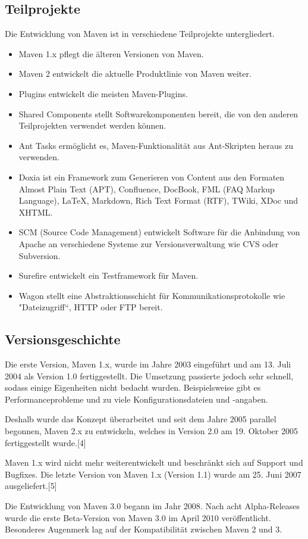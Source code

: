 \documentclass{article}
\begin{document}
\subsection{Teilprojekte}
Die Entwicklung von Maven ist in verschiedene Teilprojekte untergliedert.
\begin{itemize}
\item Maven 1.x pflegt die älteren Versionen von Maven.
\item Maven 2 entwickelt die aktuelle Produktlinie von Maven weiter.
\item Plugins entwickelt die meisten Maven-Plugins.
\item Shared Components stellt Softwarekomponenten bereit, die von den anderen Teilprojekten verwendet werden können.
\item Ant Tasks ermöglicht es, Maven-Funktionalität aus Ant-Skripten heraus zu verwenden.
\item Doxia ist ein Framework zum Generieren von Content aus den Formaten Almost Plain Text (APT), Confluence, DocBook, FML (FAQ Markup Language), LaTeX, Markdown, Rich Text Format (RTF), TWiki, XDoc und XHTML.
\item SCM (Source Code Management) entwickelt Software für die Anbindung von Apache an verschiedene Systeme zur Versionsverwaltung wie CVS oder Subversion.
\item Surefire entwickelt ein Testframework für Maven.
\item Wagon stellt eine Abstraktionsschicht für Kommunikationsprotokolle wie "Dateizugriff“, HTTP oder FTP bereit.
\end{itemize}

\subsection{Versionsgeschichte}
Die erste Version, Maven 1.x, wurde im Jahre 2003 eingeführt und am 13. Juli 2004 als Version 1.0 fertiggestellt. Die Umsetzung passierte jedoch sehr schnell, sodass einige Eigenheiten nicht bedacht wurden. Beispielsweise gibt es Performanceprobleme und zu viele Konfigurationsdateien und -angaben.

Deshalb wurde das Konzept überarbeitet und seit dem Jahre 2005 parallel begonnen, Maven 2.x zu entwickeln, welches in Version 2.0 am 19. Oktober 2005 fertiggestellt wurde.[4]

Maven 1.x wird nicht mehr weiterentwickelt und beschränkt sich auf Support und Bugfixes. Die letzte Version von Maven 1.x (Version 1.1) wurde am 25. Juni 2007 ausgeliefert.[5]

Die Entwicklung von Maven 3.0 begann im Jahr 2008. Nach acht Alpha-Releases wurde die erste Beta-Version von Maven 3.0 im April 2010 veröffentlicht. Besonderes Augenmerk lag auf der Kompatibilität zwischen Maven 2 und 3.
\end{document}
